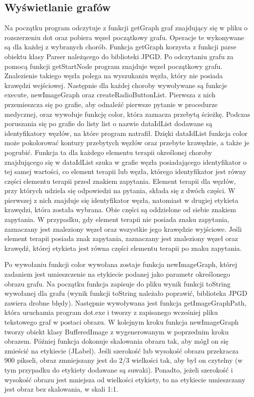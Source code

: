 \documentclass[oneside,a4paper]{book}
\begin{document}
\begin{spacing}{1.5}
\section{Wyświetlanie grafów}

Na początku program odczytuje z funkcji getGraph graf znajdujący się w pliku o rozszerzeniu dot oraz pobiera węzeł początkowy grafu. Operacje te wykonywane są dla każdej z wybranych chorób. Funkcja getGraph korzysta z funkcji parse obiektu klasy Parser należącego do biblioteki JPGD. Po odczytaniu grafu za pomocą funkcji getStartNode program znajduje węzeł początkowy grafu. Znalezienie takiego węzła polega na wyszukaniu węzła, który nie posiada krawędzi wejściowej. Następnie dla każdej choroby wywoływane są funkcje execute, newImageGraph oraz createRadioButtonList. Pierwsza z nich przemieszcza się po grafie, aby odnaleźć pierwsze pytanie w procedurze medycznej, oraz wywołuje funkcję color, która zaznacza przebytą ścieżkę. Podczas poruszania się po grafie do listy list o nazwie dataIdList dodawane są identyfikatory węzłów, na które program natrafił. Dzięki dataIdList funkcja color może pokolorować kontury przebytych węzłów oraz przebyte krawędzie, a także je pogrubić. Funkcja ta dla każdego elementu terapii określonej choroby znajdującego się w dataIdList szuka w grafie węzła posiadającego identyfikator o tej samej wartości, co element terapii lub węzła, którego identyfikator jest równy części elementu terapii przed znakiem zapytania. Element terapii dla węzłów, przy których udziela się odpowiedzi na pytania, składa się z dwóch części. W pierwszej z nich znajduje się identyfikator węzła, natomiast w drugiej etykieta krawędzi, która została wybrana. Obie części są oddzielone od siebie znakiem zapytania. W przypadku, gdy element terapii nie posiada znaku zapytania, zaznaczany jest znaleziony węzeł oraz wszystkie jego krawędzie wyjściowe.  Jeśli element terapii posiada znak zapytania, zaznaczany jest znaleziony węzeł oraz krawędź, której etykieta jest równa części elementu terapii po znaku zapytania.
 
Po wywołaniu funkcji color wywołana zostaje funkcja newImageGraph, której zadaniem jest umieszczenie na etykiecie podanej jako parametr określonego obrazu grafu. Na początku funkcja zapisuje do pliku wynik funkcji toString wywołanej dla grafu (wynik funkcji toString należało poprawić, biblioteka JPGD zawiera drobne błędy). Następnie wywoływana jest funkcja getImageGraphPath, która uruchamia program dot.exe i tworzy z zapisanego wcześniej pliku tekstowego graf w postaci obrazu. W kolejnym kroku funkcja newImageGraph tworzy obiekt klasy BufferedImage z wygenerowanym w poprzednim kroku obrazem. Później funkcja dokonuje skalowania obrazu tak, aby mógł on się zmieścić na etykiecie (JLabel). Jeśli szerokość lub wysokość obrazu przekracza 900 pikseli, obraz zmniejszany jest do 2/3 wielkości tak, aby był on czytelny (w tym przypadku do etykiety dodawane są suwaki). Ponadto, jeżeli szerokość i wysokość obrazu jest mniejsza od wielkości etykiety, to na etykiecie umieszczany jest obraz bez skalowania, w skali 1:1.
 

\end{spacing}
\end{document}
